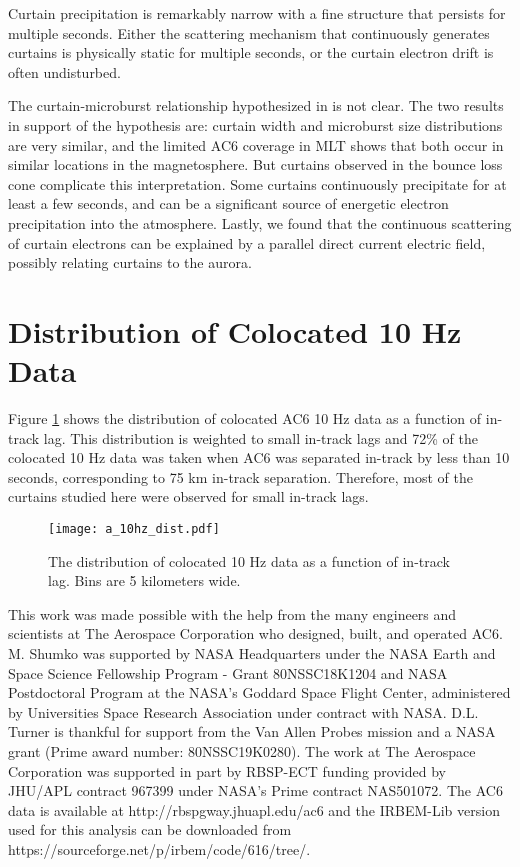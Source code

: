\documentclass[draft]{agujournal2019}
\begin{document}
Curtain precipitation is remarkably narrow with a fine structure that persists for multiple seconds. Either the scattering mechanism that continuously generates curtains is physically static for multiple seconds, or the curtain electron drift is often undisturbed. 

The curtain-microburst relationship hypothesized in  is not clear. The two results in support of the hypothesis are: curtain width and microburst size distributions are very similar, and the limited AC6 coverage in MLT shows that both occur in similar locations in the magnetosphere. But curtains observed in the bounce loss cone complicate this interpretation. Some curtains continuously precipitate for at least a few seconds, and can be a significant source of energetic electron precipitation into the atmosphere. Lastly, we found that the continuous scattering of curtain electrons can be explained by a parallel direct current electric field, possibly relating curtains to the aurora.

\appendix

\section{Distribution of Colocated 10 Hz Data}
Figure \ref{a_10Hz_dist} shows the distribution of colocated AC6 10 Hz data as a function of in-track lag. This distribution is weighted to small in-track lags and 72\% of the colocated 10 Hz data was taken when AC6 was separated in-track by less than 10 seconds, corresponding to 75 km in-track separation. Therefore, most of the curtains studied here were observed for small in-track lags.

\begin{figure}
\texttt{[image: a\_10hz\_dist.pdf]}
\caption{The distribution of colocated 10 Hz data as a function of in-track lag. Bins are 5 kilometers wide.}
\label{a_10Hz_dist}
\end{figure}

\acknowledgments
This work was made possible with the help from the many engineers and scientists at The Aerospace Corporation who designed, built, and operated AC6. M. Shumko was supported by NASA Headquarters under the NASA Earth and Space Science Fellowship Program - Grant 80NSSC18K1204 and NASA Postdoctoral Program at the NASA's Goddard Space Flight Center, administered by Universities Space Research Association under contract with NASA. D.L. Turner is thankful for support from the Van Allen Probes mission and a NASA grant (Prime award number: 80NSSC19K0280). The work at The Aerospace Corporation was supported in part by RBSP-ECT funding provided by JHU/APL contract 967399 under NASA's Prime contract NAS501072. The AC6 data is available at http://rbspgway.jhuapl.edu/ac6 and the IRBEM-Lib version used for this analysis can be downloaded from https://sourceforge.net/p/irbem/code/616/tree/.


%
\end{document}
